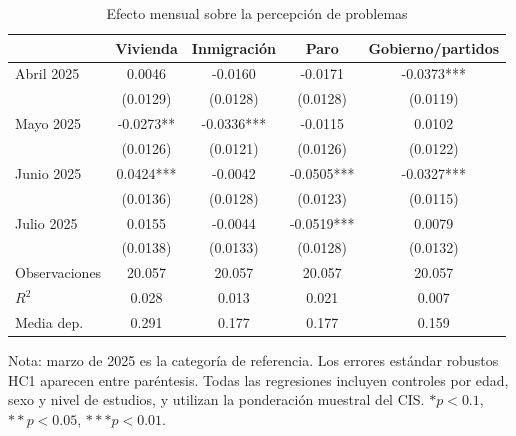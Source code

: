 \begin{table}[H]
\centering
\caption{Efecto mensual sobre la percepción de problemas}
\label{tab:problemas-completa}
\small
\begin{tabular}{lcccc}
\hline
 & Vivienda & Inmigración & Paro & Gobierno/partidos \\
\hline
Abril 2025 & 0.0046 & -0.0160 & -0.0171 & -0.0373*** \\
 & (0.0129) & (0.0128) & (0.0128) & (0.0119) \\
Mayo 2025 & -0.0273** & -0.0336*** & -0.0115 & 0.0102 \\
 & (0.0126) & (0.0121) & (0.0126) & (0.0122) \\
Junio 2025 & 0.0424*** & -0.0042 & -0.0505*** & -0.0327*** \\
 & (0.0136) & (0.0128) & (0.0123) & (0.0115) \\
Julio 2025 & 0.0155 & -0.0044 & -0.0519*** & 0.0079 \\
 & (0.0138) & (0.0133) & (0.0128) & (0.0132) \\
Observaciones & 20.057 & 20.057 & 20.057 & 20.057 \\
$R^2$ & 0.028 & 0.013 & 0.021 & 0.007 \\
Media dep. & 0.291 & 0.177 & 0.177 & 0.159 \\
\hline
\end{tabular}
\begin{flushleft}
\footnotesize Nota: marzo de 2025 es la categoría de referencia. Los errores estándar robustos HC1 aparecen entre paréntesis. Todas las regresiones incluyen controles por edad, sexo y nivel de estudios, y utilizan la ponderación muestral del CIS. $* p<0.1$, $** p<0.05$, $*** p<0.01$.
\end{flushleft}
\end{table}
